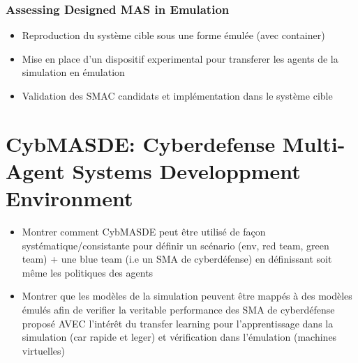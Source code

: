 \subsubsection{Assessing Designed MAS in Emulation}
\begin{itemize}

    \item Reproduction du système cible sous une forme émulée (avec container)
    \item Mise en place d'un dispositif experimental pour transferer les agents de la simulation en émulation
    \item Validation des SMAC candidats et implémentation dans le système cible

\end{itemize}

\section{CybMASDE: Cyberdefense Multi-Agent Systems Developpment Environment}\label{sec:cybmasde}

\begin{itemize}

    \item Montrer comment CybMASDE peut être utilisé de façon systématique/consistante pour définir un scénario (env, red team, green team) + une blue team (i.e un SMA de cyberdéfense) en définissant soit même les politiques des agents
    \item Montrer que les modèles de la simulation peuvent être mappés à des modèles émulés afin de verifier la veritable performance des SMA de cyberdéfense proposé AVEC l'intérêt du transfer learning pour l’apprentissage dans la simulation (car rapide et leger) et vérification dans l’émulation (machines virtuelles)
\end{itemize}
